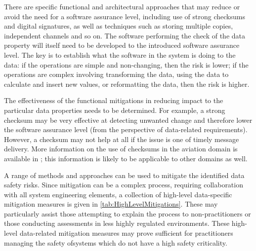 There are specific functional and architectural approaches that may reduce or avoid the need for a \gls{software assurance level}, including use of strong checksums and digital signatures, as well as techniques such as storing multiple copies, independent channels and so on. The software performing the check of the \gls{data property} will itself need to be developed to the introduced \gls{software assurance level}. The key is to establish what the software in the system is doing to the data: if the operations are simple and non-changing, then the risk is lower; if the operations are complex involving transforming the data, using the data to calculate and insert new values, or reformatting the data, then the risk is higher.

The effectiveness of the functional \glspl{mitigation} in reducing impact to the particular data properties needs to be determined. For example, a strong checksum may be very effective at detecting unwanted change and therefore lower the \gls{software assurance level} (from the perspective of data-related requirements). However, a checksum may not help at all if the issue is one of timely message delivery. More \gls{information} on the use of checksums in the aviation domain is available in \cite{citation:koopman2015selection}; this \gls{information} is likely to be applicable to other domains as well.

A range of methods and approaches can be used to mitigate the identified data safety risks. Since \gls{mitigation} can be a complex process, requiring collaboration with all system engineering elements, a collection of high-level data-specific \gls{mitigation} measures is given in \autoref{tab:HighLevelMitigations}. These may particularly assist those attempting to explain the process to non-practitioners or those conducting assessments in less highly regulated environments. These high-level data-related \gls{mitigation} measures may prove sufficient for practitioners \cbstart managing the safety of\cbend systems which do not have a high safety criticality.

